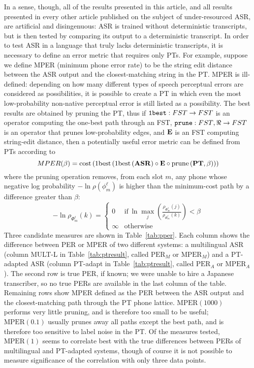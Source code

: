 In a sense, though, all of the results presented in this article, and
all results presented in every other article published on the subject
of under-resourced ASR, are artificial and disingenuous: ASR is
trained without deterministic transcripts, but is then tested by
comparing its output to a deterministic transcript.  In order to test
ASR in a language that truly lacks deterministic transcripts, it is
necessary to define an error metric that requires only PTs.  For
example, suppose we define MPER (minimum phone error rate) to be the
string edit distance between the ASR output and the closest-matching
string in the PT.  MPER is ill-defined: depending on how many
different types of speech perceptual errors are considered as
possibilities, it is possible to create a PT in which even the most
low-probability non-native perceptual error is still listed as a
possibility.  The best results are obtained by pruning the PT, thus if
${\tt 1best}:\mbox{FST}\rightarrow\mbox{FST}$ is an operator computing
the one-best path through an FST, ${\tt
  prune}:\mbox{FST},\Re\rightarrow\mbox{FST}$ is an operator that
prunes low-probability edges, and ${\bf E}$ is an FST computing
string-edit distance, then a potentially useful error metric can be
defined from PTs according to
\begin{equation}
  \mbox{MPER}(\beta) = \mathrm{cost}
  \left(\mathrm{1best}
  \left(\mathrm{1best}
  \left({\bf ASR}\right)
  \circ{\bf E}\circ\mathrm{prune}
  \left({\bf PT},\beta\right)
  \right)
  \right)
\end{equation}
where the pruning operation removes, from each slot $m$, any phone
whose negative log probability $-\ln\rho(\phi_m^\ell)$ is higher than
the minimum-cost path by a difference greater than $\beta$:
\begin{equation}
-\ln\hat{\rho}_{\Phi_m^\ell}(k) = \left\{\begin{array}{ll}
0 & \mbox{if}~\ln\max_j \left(\frac{\rho_{\Phi_m^\ell}(j)}
    {\rho_{\Phi_m^\ell}(k)}\right) < \beta \\
    \infty & \mbox{otherwise}
    \end{array}\right.
\label{eq:pper}
\end{equation}
Three candidate measures are shown in Table~\ref{tab:pper}.  Each
column shows the difference between PER or MPER of two different
systems: a multilingual ASR (column {\sc MULT-L} in
Table~\ref{tab:ptresult}, called $\mbox{PER}_M$ or $\mbox{MPER}_M$)
and a PT-adapted ASR (column {\sc PT-adapt} in
Table~\ref{tab:ptresult}, called $\mbox{PER}_A$ or $\mbox{MPER}_A$).
The second row is true PER, if known; we were unable to hire a
Japanese transcriber, so no true PERs are available in the last column
of the table.  Remaining rows show MPER defined as the PER between the
ASR output and the closest-matching path through the PT phone lattice.
$\mbox{MPER}(1000)$ performs very little pruning, and is therefore too
small to be useful; $\mbox{MPER}(0.1)$ usually prunes away all paths
except the best path, and is therefore too sensitive to label noise in
the PT.  Of the measures tested, $\mbox{MPER}(1)$ seems to correlate
best with the true differences between PERs of multilingual and
PT-adapted systems, though of course it is not possible to measure
significance of the correlation with only three data points.

